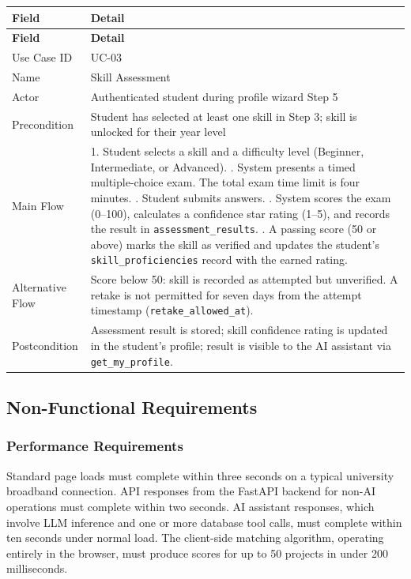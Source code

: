 \documentclass[12pt,a4paper]{article}
\begin{document}
\begin{longtable}{@{} L{3.5cm} L{11cm} @{}}
\toprule
\textbf{Field} & \textbf{Detail} \\
\midrule
\endfirsthead
\toprule
\textbf{Field} & \textbf{Detail} \\
\midrule
\endhead
\bottomrule
\endlastfoot
Use Case ID     & UC-03 \\[2pt]
Name            & Skill Assessment \\[2pt]
Actor           & Authenticated student during profile wizard Step 5 \\[2pt]
Precondition    & Student has selected at least one skill in Step 3; skill is unlocked for their year level \\[2pt]
Main Flow       &
  1. Student selects a skill and a difficulty level (Beginner, Intermediate, or Advanced). . System presents a timed multiple-choice exam. The total exam time limit is four minutes. . Student submits answers. . System scores the exam (0--100), calculates a confidence star rating (1--5), and records the result in \texttt{assessment\_results}. . A passing score (50 or above) marks the skill as verified and updates the student's \texttt{skill\_proficiencies} record with the earned rating. \\[2pt]
Alternative Flow &
  Score below 50: skill is recorded as attempted but unverified. A retake is not permitted for seven days from the attempt timestamp (\texttt{retake\_allowed\_at}). \\[2pt]
Postcondition   & Assessment result is stored; skill confidence rating is updated in the student's profile; result is visible to the AI assistant via \texttt{get\_my\_profile}. \\
\end{longtable}

\subsection{Non-Functional Requirements}

\subsubsection{Performance Requirements}

Standard page loads must complete within three seconds on a typical university broadband
connection. API responses from the FastAPI backend for non-AI operations must complete
within two seconds. AI assistant responses, which involve LLM inference and one or more
database tool calls, must complete within ten seconds under normal load. The client-side
matching algorithm, operating entirely in the browser, must produce scores for up to
50 projects in under 200 milliseconds.
\end{document}
